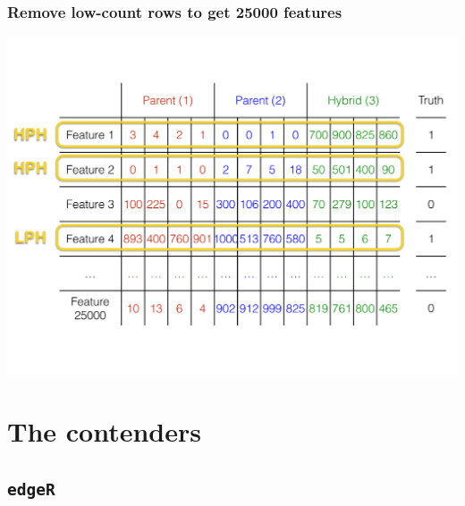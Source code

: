 \documentclass[handout]{beamer}
\numberwithin{equation}{section}
\begin{document}
\begin{frame}
\frametitle{Remove low-count rows to get 25000 features}
\begin{center}
\includegraphics[scale=.28]{data}
\end{center}
\end{frame}

\section{The contenders}

\subsection{{\tt edgeR}}
\end{document}
